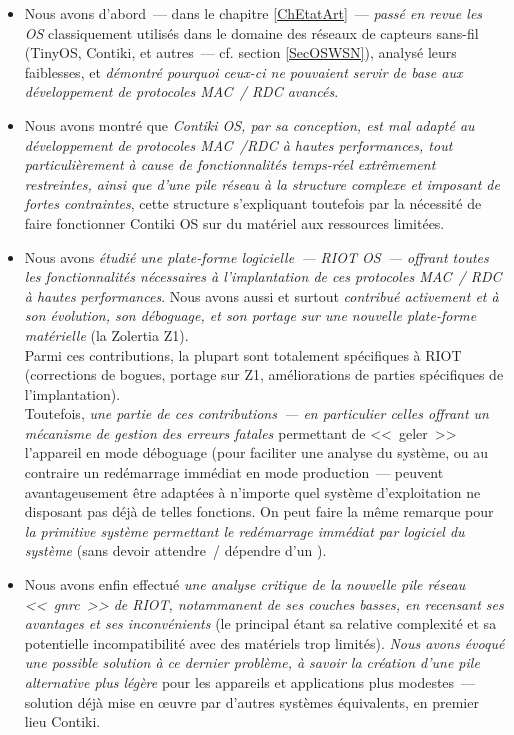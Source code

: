 \begin{itemize}

\item Nous avons d'abord~--- dans le chapitre \ref{ChEtatArt}~---
\emph{passé en revue les OS} classiquement utilisés dans le domaine des
réseaux de capteurs sans-fil (TinyOS, Contiki, et autres~--- cf. section
\vref{SecOSWSN}), analysé leurs faiblesses, et \emph{démontré
pourquoi ceux-ci ne pouvaient servir de base aux développement
de protocoles MAC~/ RDC avancés}.

\item Nous avons montré que \emph{Contiki OS, par sa conception,
est mal adapté au développement de protocoles MAC~/RDC à hautes
performances, tout particulièrement à cause de fonctionnalités temps-réel
extrêmement restreintes, ainsi que d'une pile réseau à la structure complexe
et imposant de fortes contraintes}, cette structure s'expliquant toutefois
par la nécessité de faire fonctionner Contiki OS sur du matériel aux
ressources limitées.

\item Nous avons \emph{étudié une plate-forme logicielle~--- RIOT OS~---
offrant toutes les fonctionnalités nécessaires à l'implantation de
ces protocoles MAC~/ RDC à hautes performances}. Nous avons aussi et
surtout \emph{contribué activement et à son évolution, son déboguage,
et son portage sur une nouvelle plate-forme matérielle}
(la Zolertia Z1). \\
Parmi ces contributions, la plupart sont totalement spécifiques à RIOT
(corrections de bogues, portage sur Z1, améliorations de parties
spécifiques de l'implantation). \\
Toutefois, \emph{une partie de ces contributions~--- en particulier
celles offrant un mécanisme de gestion des erreurs fatales
\cite{PRriotPanic}} permettant de <<~geler~>> l'appareil en mode déboguage
(pour faciliter une analyse  du système, ou au contraire
un redémarrage immédiat en mode production~--- peuvent avantageusement être
adaptées à n'importe quel système d'exploitation ne disposant pas déjà de
telles fonctions. On peut faire la même remarque pour \emph{la primitive
système permettant le redémarrage immédiat par logiciel du système}
\cite{PRriotEnh5} (sans devoir attendre~/ dépendre d'un ).

\item Nous avons enfin effectué \emph{une analyse critique de la nouvelle
pile réseau <<~gnrc~>> de RIOT, notammanent de ses couches basses, en
recensant ses avantages et ses inconvénients} (le principal étant sa
relative complexité et sa potentielle incompatibilité avec des matériels
trop limités). \emph{Nous avons évoqué une possible solution à ce dernier
problème, à savoir la création d'une pile alternative plus légère} pour
les appareils et applications plus modestes~--- solution déjà mise en
{\oe}uvre par d'autres systèmes équivalents, en premier lieu Contiki.

\end{itemize}

